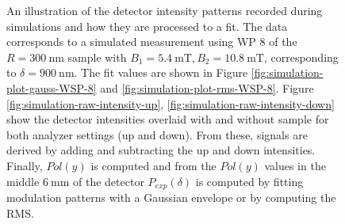 \begin{figure}[htbp]
	\caption{An illustration of the detector intensity patterns recorded during simulations and how they are processed to a fit. The data corresponds to a simulated measurement using WP 8 of the $R = \SI{300}{\nano\meter}$ sample with $B_1 = \SI{5.4}{\milli\tesla}, B_2 = \SI{10.8}{\milli\tesla}$, corresponding to $\delta = \SI{900}{\nano\meter}$. The fit values are shown in Figure \ref{fig:simulation-plot-gauss-WSP-8} and \ref{fig:simulation-plot-rms-WSP-8}. Figure \ref{fig:simulation-raw-intensity-up}, \ref{fig:simulation-raw-intensity-down} show the detector intensities overlaid with and without sample for both analyzer settings (up and down). From these, signals are derived by adding and subtracting the up and down intensities. Finally, $Pol(y)$ is computed and from the $Pol(y)$ values in the middle $\SI{6}{\milli\meter}$ of the detector $P_{exp}(\delta)$ is computed by fitting modulation patterns with a Gaussian envelope or by computing the RMS.}
	\label{fig:simulation-raw-intensity}
\end{figure}

